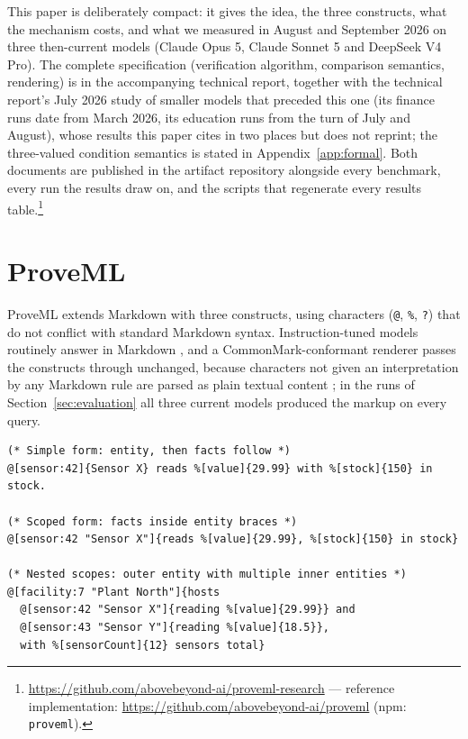 \documentclass[11pt,a4paper]{article}
\begin{document}
This paper is deliberately compact: it gives the idea, the three constructs, what the mechanism costs, and what we measured in August and September 2026 on three then-current models (Claude Opus 5, Claude Sonnet 5 and DeepSeek V4 Pro). The complete specification (verification algorithm, comparison semantics, rendering) is in the accompanying technical report, together with the technical report's July 2026 study of smaller models that preceded this one (its finance runs date from March 2026, its education runs from the turn of July and August), whose results this paper cites in two places but does not reprint; the three-valued condition semantics is stated in Appendix~\ref{app:formal}. Both documents are published in the artifact repository alongside every benchmark, every run the results draw on, and the scripts that regenerate every results table.\footnote{\url{https://github.com/abovebeyond-ai/proveml-research} --- reference implementation: \url{https://github.com/abovebeyond-ai/proveml} (npm: \texttt{proveml}).}

\section{ProveML}
\label{sec:proveml}

ProveML extends Markdown with three constructs, using characters (\texttt{@}, \texttt{\%}, \texttt{?}) that do not conflict with standard Markdown syntax. Instruction-tuned models routinely answer in Markdown \citep{sun2025idiosyncrasies}, and a CommonMark-conformant renderer passes the constructs through unchanged, because characters not given an interpretation by any Markdown rule are parsed as plain textual content \citep{commonmark}; in the runs of Section~\ref{sec:evaluation} all three current models produced the markup on every query.

\begin{lstlisting}
(* Simple form: entity, then facts follow *)
@[sensor:42]{Sensor X} reads %[value]{29.99} with %[stock]{150} in stock.

(* Scoped form: facts inside entity braces *)
@[sensor:42 "Sensor X"]{reads %[value]{29.99}, %[stock]{150} in stock}

(* Nested scopes: outer entity with multiple inner entities *)
@[facility:7 "Plant North"]{hosts
  @[sensor:42 "Sensor X"]{reading %[value]{29.99}} and
  @[sensor:43 "Sensor Y"]{reading %[value]{18.5}},
  with %[sensorCount]{12} sensors total}
\end{lstlisting}
\end{document}
